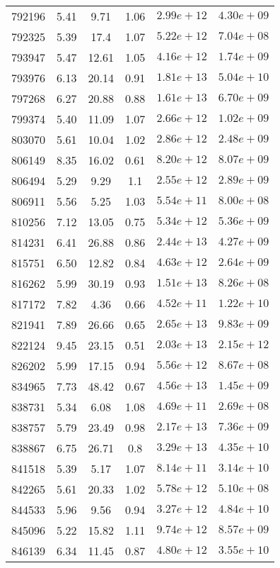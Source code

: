 \begin{table}
\begin{tabular}{cccccc}
792196 & 5.41 & 9.71 & 1.06 & $2.99e+12$ & $4.30e+09$ \\
792325 & 5.39 & 17.4 & 1.07 & $5.22e+12$ & $7.04e+08$ \\
793947 & 5.47 & 12.61 & 1.05 & $4.16e+12$ & $1.74e+09$ \\
793976 & 6.13 & 20.14 & 0.91 & $1.81e+13$ & $5.04e+10$ \\
797268 & 6.27 & 20.88 & 0.88 & $1.61e+13$ & $6.70e+09$ \\
799374 & 5.40 & 11.09 & 1.07 & $2.66e+12$ & $1.02e+09$ \\
803070 & 5.61 & 10.04 & 1.02 & $2.86e+12$ & $2.48e+09$ \\
806149 & 8.35 & 16.02 & 0.61 & $8.20e+12$ & $8.07e+09$ \\
806494 & 5.29 & 9.29 & 1.1 & $2.55e+12$ & $2.89e+09$ \\
806911 & 5.56 & 5.25 & 1.03 & $5.54e+11$ & $8.00e+08$ \\
810256 & 7.12 & 13.05 & 0.75 & $5.34e+12$ & $5.36e+09$ \\
814231 & 6.41 & 26.88 & 0.86 & $2.44e+13$ & $4.27e+09$ \\
815751 & 6.50 & 12.82 & 0.84 & $4.63e+12$ & $2.64e+09$ \\
816262 & 5.99 & 30.19 & 0.93 & $1.51e+13$ & $8.26e+08$ \\
817172 & 7.82 & 4.36 & 0.66 & $4.52e+11$ & $1.22e+10$ \\
821941 & 7.89 & 26.66 & 0.65 & $2.65e+13$ & $9.83e+09$ \\
822124 & 9.45 & 23.15 & 0.51 & $2.03e+13$ & $2.15e+12$ \\
826202 & 5.99 & 17.15 & 0.94 & $5.56e+12$ & $8.67e+08$ \\
834965 & 7.73 & 48.42 & 0.67 & $4.56e+13$ & $1.45e+09$ \\
838731 & 5.34 & 6.08 & 1.08 & $4.69e+11$ & $2.69e+08$ \\
838757 & 5.79 & 23.49 & 0.98 & $2.17e+13$ & $7.36e+09$ \\
838867 & 6.75 & 26.71 & 0.8 & $3.29e+13$ & $4.35e+10$ \\
841518 & 5.39 & 5.17 & 1.07 & $8.14e+11$ & $3.14e+10$ \\
842265 & 5.61 & 20.33 & 1.02 & $5.78e+12$ & $5.10e+08$ \\
844533 & 5.96 & 9.56 & 0.94 & $3.27e+12$ & $4.84e+10$ \\
845096 & 5.22 & 15.82 & 1.11 & $9.74e+12$ & $8.57e+09$ \\
846139 & 6.34 & 11.45 & 0.87 & $4.80e+12$ & $3.55e+10$ \\

\end{tabular}
\end{table}
